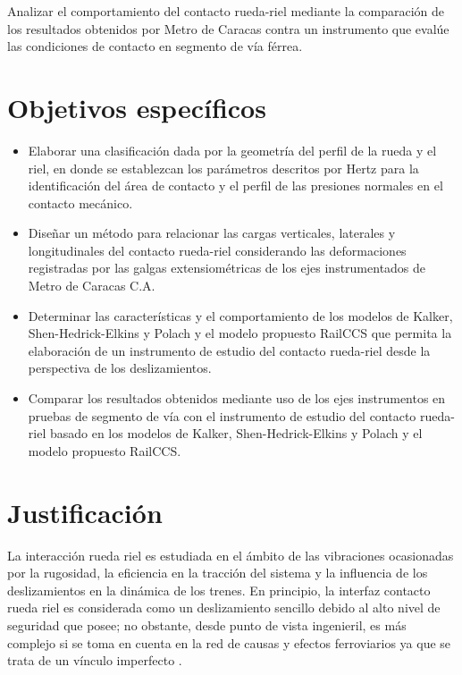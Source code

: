 \documentclass[main]{subfiles}
\begin{document}
	Analizar el comportamiento del contacto rueda-riel mediante la comparación de los resultados obtenidos por Metro de Caracas contra un instrumento que evalúe las condiciones de contacto en segmento de vía férrea.

\section{Objetivos específicos}
\begin{itemize}
	\item Elaborar una clasificación dada por la geometría del perfil de la rueda y el riel, en donde se establezcan los parámetros descritos por Hertz para la identificación del área de contacto y el perfil de las presiones normales en el contacto mecánico.
	
	\item  Diseñar un método para relacionar las cargas verticales, laterales y longitudinales del contacto rueda-riel considerando las deformaciones registradas por las galgas extensiométricas de los ejes instrumentados de Metro de Caracas C.A. 
		
	\item  Determinar las características y el comportamiento de los modelos de Kalker, Shen-Hedrick-Elkins y Polach y el modelo propuesto RailCCS que permita la elaboración de un instrumento de estudio del contacto rueda-riel desde la perspectiva de los deslizamientos. 
	
	\item  Comparar los resultados obtenidos mediante uso de los ejes instrumentos en pruebas de segmento de vía con el instrumento de estudio del contacto rueda-riel basado en los modelos de Kalker, Shen-Hedrick-Elkins y Polach y el modelo propuesto RailCCS.
\end{itemize}

\section{Justificación}
	La interacción rueda riel es estudiada en el ámbito de las vibraciones ocasionadas por la rugosidad, la eficiencia en la tracción del sistema y la influencia de los deslizamientos en la dinámica de los trenes. En principio, la interfaz contacto rueda riel es considerada como un deslizamiento sencillo debido al alto nivel de seguridad que posee; no obstante, desde punto de vista ingenieril, es más complejo si se toma en cuenta en la red de causas y efectos ferroviarios ya que se trata de un vínculo imperfecto \citet{iwnicki2006handbook}.
\end{document}
